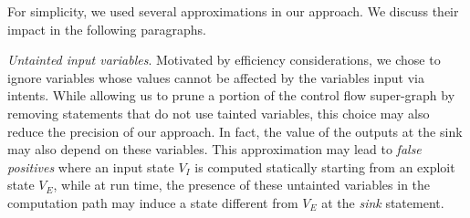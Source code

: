 For simplicity, we used several approximations in our approach. We discuss their impact in the following paragraphs.

\emph{Untainted input variables}. Motivated by efficiency considerations, we chose to ignore variables whose values cannot be affected by the variables input via intents. While allowing us to prune a portion of the control flow super-graph by removing statements that do not use tainted variables, this choice may also reduce the precision of our approach. In fact, the value of the outputs at the sink may also depend on these variables. This approximation may lead to \textit{false positives} where an input state $V_I$ is computed statically starting from an exploit state $V_E$, while at run time, the presence of these untainted variables in the computation path may induce a state different from $V_E$ at the \textit{sink} statement.



